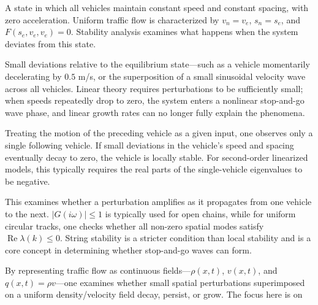 \documentclass[11pt,a4paper,openany]{book}
\numberwithin{equation}{chapter}
\numberwithin{figure}{chapter}
\numberwithin{table}{chapter}
\begin{document}
\begin{description}[style=unboxed,leftmargin=0pt,labelindent=0pt,labelsep=0.5em,itemsep=0.65em,font=\normalfont\bfseries\color{navy}]
\item[Equilibrium]


A state in which all vehicles maintain constant speed and constant spacing, with zero acceleration. Uniform traffic flow is characterized by $v_n=v_e$, $s_n=s_e$, and $F(s_e,v_e,v_e)=0$. Stability analysis examines what happens when the system deviates from this state.



\item[Perturbation]


Small deviations relative to the equilibrium state—such as a vehicle momentarily decelerating by $0.5$ m/s, or the superposition of a small sinusoidal velocity wave across all vehicles. Linear theory requires perturbations to be sufficiently small; when speeds repeatedly drop to zero, the system enters a nonlinear stop-and-go wave phase, and linear growth rates can no longer fully explain the phenomena.



\item[Local stability]


Treating the motion of the preceding vehicle as a given input, one observes only a single following vehicle. If small deviations in the vehicle's speed and spacing eventually decay to zero, the vehicle is locally stable. For second-order linearized models, this typically requires the real parts of the single-vehicle eigenvalues to be negative.\item[String stability]This examines whether a perturbation amplifies as it propagates from one vehicle to the next. $|G(i\omega)|\le1$ is typically used for open chains, while for uniform circular tracks, one checks whether all non-zero spatial modes satisfy $\operatorname{Re}\lambda(k)\le0$. String stability is a stricter condition than local stability and is a core concept in determining whether stop-and-go waves can form.



\item[Macroscopic traffic-flow stability]


By representing traffic flow as continuous fields—$\rho(x,t)$, $v(x,t)$, and $q(x,t)=\rho v$—one examines whether small spatial perturbations superimposed on a uniform density/velocity field decay, persist, or grow. The focus here is on


\end{description}
\end{document}
